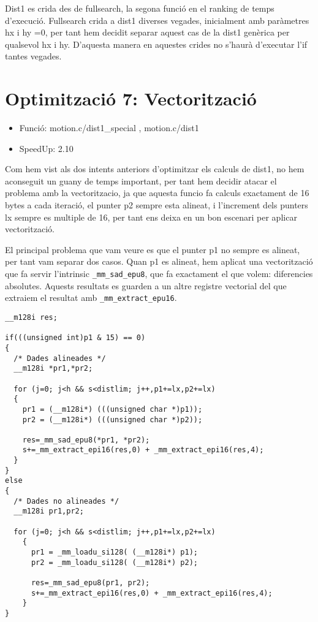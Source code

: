 Dist1 es crida des de fullsearch, la segona funció en el ranking de temps d'execució. Fullsearch crida a dist1 diverses vegades, inicialment amb paràmetres hx i hy =0, per tant hem decidit separar aquest cas de la dist1 genèrica per qualsevol hx i hy. D'aquesta manera en aquestes crides no s'haurà d'executar l'if tantes vegades.

\section{Optimitzaci\'o 7: Vectoritzaci\'o}
\begin{itemize}
\item{Funció: motion.c/dist1\_special , motion.c/dist1}
\item{SpeedUp: 2.10}
\end{itemize}

Com hem vist als dos intents anteriors d'optimitzar els calculs de dist1, no hem aconseguit un guany de temps important, per tant hem decidir atacar el problema amb la vectoritzacio, ja que aquesta funcio fa calculs exactament de 16 bytes a cada iteració, el punter p2 sempre esta alineat, i l'increment dels punters lx sempre es multiple de 16, per tant ens deixa en un bon escenari per aplicar vectorització.

El principal problema que vam veure es que el punter p1 no sempre es alineat, per tant vam separar dos casos. Quan p1 es alineat, hem aplicat una vectorització que fa servir l'intrinsic \texttt{\_mm\_sad\_epu8}, que fa exactament el que volem: diferencies absolutes. Aquests resultats es guarden a un altre registre vectorial del que extraiem el resultat amb \texttt{\_mm\_extract\_epu16}.

\begin{lstlisting}
__m128i res;  
 
if(((unsigned int)p1 & 15) == 0)
{
  /* Dades alineades */
  __m128i *pr1,*pr2;

  for (j=0; j<h && s<distlim; j++,p1+=lx,p2+=lx)
  {   
    pr1 = (__m128i*) (((unsigned char *)p1));
    pr2 = (__m128i*) (((unsigned char *)p2));
		
    res=_mm_sad_epu8(*pr1, *pr2);
    s+=_mm_extract_epi16(res,0) + _mm_extract_epi16(res,4);
  }
}
else
{
  /* Dades no alineades */
  __m128i pr1,pr2;

  for (j=0; j<h && s<distlim; j++,p1+=lx,p2+=lx)
	{  
	  pr1 = _mm_loadu_si128( (__m128i*) p1);
	  pr2 = _mm_loadu_si128( (__m128i*) p2);
		
	  res=_mm_sad_epu8(pr1, pr2);
	  s+=_mm_extract_epi16(res,0) + _mm_extract_epi16(res,4);
	}  
}   
\end{lstlisting}

